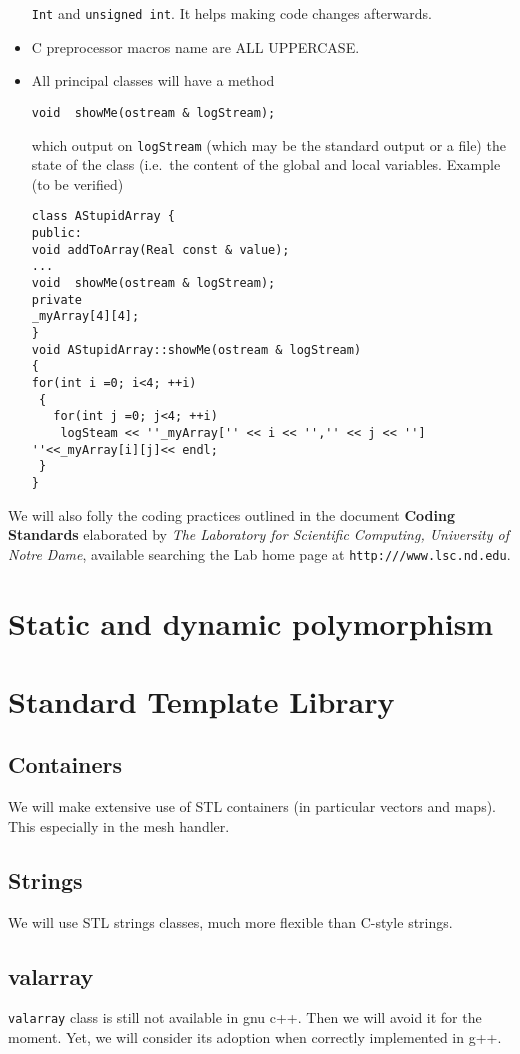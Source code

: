\begin{itemize}
  \texttt{Int} and \texttt{unsigned int}.  It helps making code
  changes afterwards. 
\item C preprocessor macros name are ALL UPPERCASE.
\item All principal classes will have a method
\begin{verbatim}
void  showMe(ostream & logStream);
\end{verbatim}
  which output on \texttt{logStream} (which may be the standard output
  or a file)  the state of the class (i.e.\  the content of the global
  and local variables.  Example (to be verified)
\begin{verbatim}
class AStupidArray {
public:
void addToArray(Real const & value);
...
void  showMe(ostream & logStream);
private  
_myArray[4][4];
}
void AStupidArray::showMe(ostream & logStream)
{
for(int i =0; i<4; ++i)
 {
   for(int j =0; j<4; ++i)
    logSteam << ''_myArray['' << i << '','' << j << ''] ''<<_myArray[i][j]<< endl;
 }
}
\end{verbatim}
\end{itemize}
We will also folly the coding practices outlined in the document
\textbf{Coding Standards} elaborated by \emph{The Laboratory for
  Scientific Computing, University of Notre Dame}, available
searching the Lab home page at \texttt{http:///www.lsc.nd.edu}.
                                
%
\section{Static and dynamic polymorphism}
%

% 
\section{Standard Template Library}
%
\subsection{Containers} We will make extensive use of STL containers
(in particular vectors and maps). This especially in the mesh handler.
\subsection{Strings}
%
We will use STL strings classes, much more flexible than C-style
strings.
\subsection{valarray}
%
\texttt{valarray} class is still not available in gnu c++. Then we
will avoid it for the moment. Yet, we will consider its adoption when correctly implemented in g++.
%
